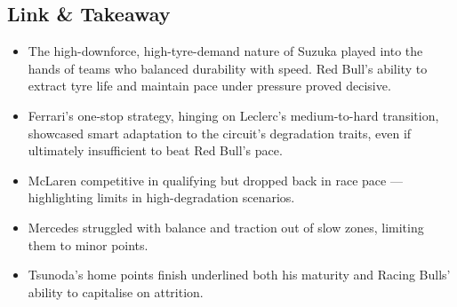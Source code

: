 \subsection{Link \& Takeaway}

\begin{itemize}
    \item The high-downforce, high-tyre-demand nature of Suzuka played into the hands of teams who balanced durability with speed. Red Bull’s ability to extract tyre life and maintain pace under pressure proved decisive.
    \item Ferrari’s one-stop strategy, hinging on Leclerc’s medium-to-hard transition, showcased smart adaptation to the circuit’s degradation traits, even if ultimately insufficient to beat Red Bull’s pace.
    \item McLaren competitive in qualifying but dropped back in race pace — highlighting limits in high-degradation scenarios. 
    \item Mercedes struggled with balance and traction out of slow zones, limiting them to minor points. 
    \item Tsunoda’s home points finish underlined both his maturity and Racing Bulls’ ability to capitalise on attrition.
\end{itemize}